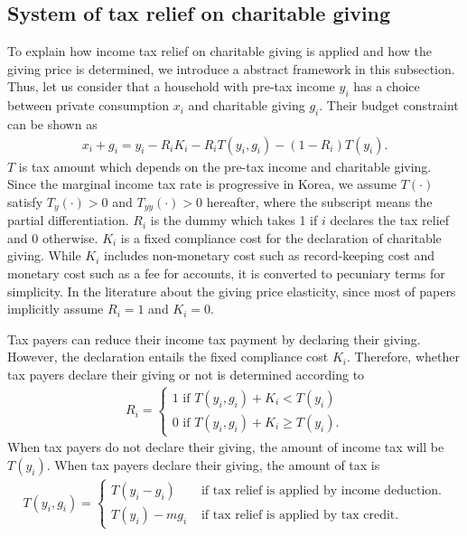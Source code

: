\documentclass[
  11pt,
  a4paper,
]{article}
\begin{document}
\hypertarget{system-of-tax-relief-on-charitable-giving}{%
\subsection{System of tax relief on charitable giving}\label{system-of-tax-relief-on-charitable-giving}}

To explain how income tax relief on charitable giving is applied and
how the giving price is determined,
we introduce a abstract framework in this subsection.
Thus, let us consider that a household with pre-tax income \(y_i\)
has a choice between private consumption \(x_i\) and charitable giving \(g_i\).
Their budget constraint can be shown as
\begin{align}
x_i + g_i = y_i − R_iK_i - R_iT(y_i, g_i) - (1-R_i)T(y_i). \label{eq:budget}
\end{align}
\(T\) is tax amount which depends on the pre-tax income and charitable giving.
Since the marginal income tax rate is progressive in Korea,
we assume \(T(\cdot)\) satisfy \(T_y(\cdot)>0\) and \(T_{yy}(\cdot)>0\) hereafter,
where the subscript means the partial differentiation.
\(R_i\) is the dummy which takes 1 if \(i\) declares the tax relief and 0 otherwise.
\(K_i\) is a fixed compliance cost for the declaration of charitable giving.
While \(K_i\) includes non-monetary cost such as record-keeping cost and
monetary cost such as a fee for accounts,
it is converted to pecuniary terms for simplicity.
In the literature about the giving price elasticity,
since most of papers implicitly assume \(R_i=1\) and \(K_i=0\).

Tax payers can reduce their income tax payment by declaring their giving.
However, the declaration entails the fixed compliance cost \(K_i\).
Therefore, whether tax payers declare their giving or not is determined according to
\begin{align}
  R_i = \begin{cases}
      1 \text{ if }T(y_i, g_i) + K_i<T(y_i)\\
      0 \text{ if }T(y_i, g_i) + K_i\ge T(y_i). \label{eq:R}
  \end{cases}
\end{align}
When tax payers do not declare their giving, the amount of income tax will be \(T(y_i)\).
When tax payers declare their giving, the amount of tax is
\begin{align}
  T(y_i, g_i) =
  \begin{cases} 
      T(y_i-g_i)&\text{ if tax relief is applied by income deduction.}\\
      T(y_i)-mg_i &\text{ if tax relief is applied by tax credit.} \label{eq:relief}
  \end{cases}
\end{align}
\end{document}
